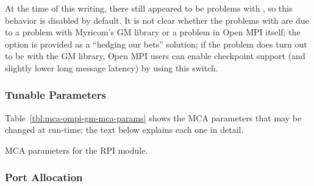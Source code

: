 At the time of this writing, there still appeared to be problems with
, so this behavior is disabled by default.  It is
not clear whether the problems with  are due to a
problem with Myricom's GM library or a problem in Open MPI itself; the
 option is provided as a ``hedging our
bets'' solution; if the problem does turn out to be with the GM
library, Open MPI users can enable checkpoint support (and slightly lower
long message latency) by using this switch.



\subsubsection{Tunable Parameters}

Table~\ref{tbl:mca-ompi-gm-mca-params} shows the MCA parameters that
may be changed at run-time; the text below explains each one in
detail.

\begin{table}[htbp]
  \begin{ssiparamtb}
%
%
%
%
%
%
%
  \end{ssiparamtb}
  \caption{MCA parameters for the  RPI module.}
  \label{tbl:mca-ompi-gm-mca-params}
\end{table}


\subsubsection{Port Allocation}

